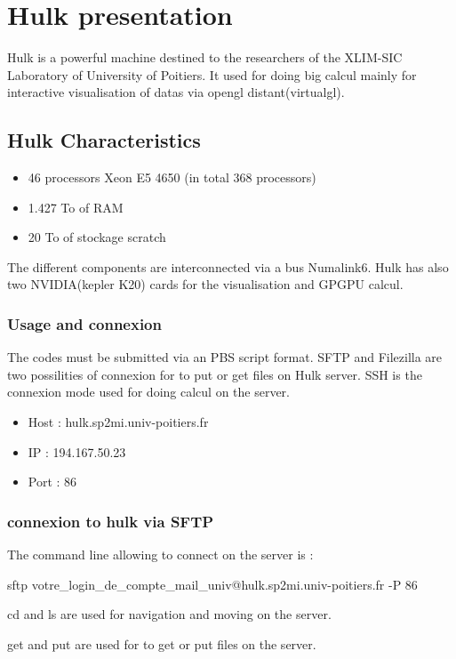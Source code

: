 \documentclass[12pt]{article}
\begin{document}
\section*{Hulk presentation}


Hulk is a powerful machine destined to the researchers of the XLIM-SIC Laboratory of University of Poitiers. It used for doing big calcul mainly for interactive visualisation of datas via opengl distant(virtualgl).

\subsection*{Hulk Characteristics}
\begin{itemize}
	\item	 46 processors Xeon E5 4650 (in total 368 processors)
	\item	1.427 To of RAM
	\item	20 To of stockage scratch
\end{itemize}
	
The different components are interconnected via a bus Numalink6. Hulk has also two NVIDIA(kepler K20)  cards for the visualisation and GPGPU calcul.

\subsubsection*{Usage and connexion }
The codes must be submitted via an PBS script format.
SFTP and Filezilla are two possilities of connexion for to put or get files on Hulk server. 
SSH is the connexion mode used for doing calcul on the server.
\begin{itemize}
	\item	 Host : hulk.sp2mi.univ-poitiers.fr
	\item	IP : 194.167.50.23 
	\item	Port : 86
\end{itemize}

\subsubsection*{connexion to hulk via SFTP}

The command line allowing to connect on the server is :
 
sftp votre\_login\_de\_compte\_mail\_univ@hulk.sp2mi.univ-poitiers.fr -P 86

cd and ls are used for navigation and moving on the server.

get and put are used for to get or put files  on the server.
\end{document}

